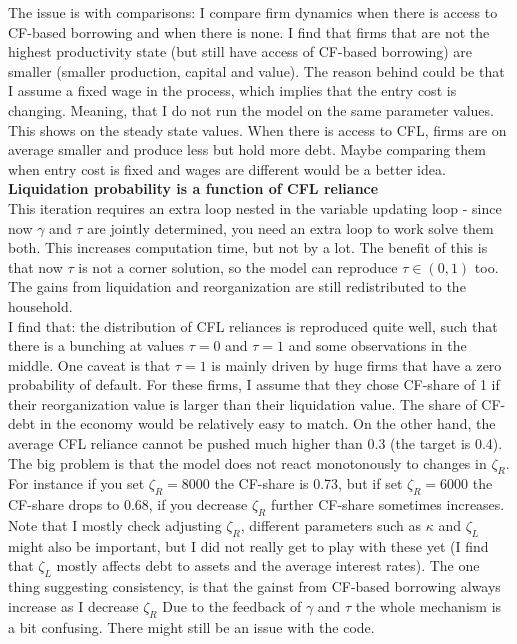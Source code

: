 \documentclass[12pt]{article}
\begin{document}
The issue is with comparisons: I compare firm dynamics when there is access to CF-based borrowing and when there is none. I find that firms that are not the highest productivity state (but still have access of CF-based borrowing) are smaller (smaller production, capital and value). The reason behind could be that I assume a fixed wage in the process, which implies that the entry cost is changing. Meaning, that I do not run the model on the same parameter values. This shows on the steady state values.  When there is access to CFL, firms are on average smaller and produce less but hold more debt. Maybe comparing them when entry cost is fixed and wages are different would be a better idea. \vspace{3mm} \\
\textbf{Liquidation probability is a function of CFL reliance} \\
This iteration requires an extra loop nested in the variable updating loop - since now $\gamma$ and $\tau$ are jointly determined, you need an extra loop to work solve them both. This increases computation time, but not by a lot. The benefit of this is that now $\tau$ is not a corner solution, so the model can reproduce $\tau \in (0,1)$ too. The gains from liquidation and reorganization are still redistributed to the household. \vspace{3mm} \\
I find that: the distribution of CFL reliances is reproduced quite well, such that there is a bunching at values $\tau = 0$ and $\tau = 1$ and some observations in the middle. One caveat is that $\tau = 1$ is mainly driven by huge firms that have a zero probability of default. For these firms, I assume that they chose CF-share of 1 if their reorganization value is larger than their liquidation value. The share of CF-debt in the economy would be relatively easy to match. On the other hand, the average CFL reliance cannot be pushed much higher than 0.3 (the target is 0.4).   \vspace{3mm} \\
The big problem is that the model does not react monotonously to changes in $\zeta_R$. For instance if you set $\zeta_R = 8000$ the CF-share is 0.73, but if set $\zeta_R = 6000$ the CF-share drops to 0.68, if you decrease $\zeta_R$ further CF-share sometimes increases. Note that I mostly check adjusting $\zeta_R$, different parameters such as $\kappa$ and $\zeta_L$ might also be important, but I did not really get to play with these yet (I find that $\zeta_L$ mostly affects debt to assets and the average interest rates). The one thing suggesting consistency, is that the gainst from CF-based borrowing always increase as I decrease $\zeta_R$ Due to the feedback of $\gamma$ and $\tau$ the whole mechanism is a bit confusing. There might still be an issue with the code. 
\end{document}
